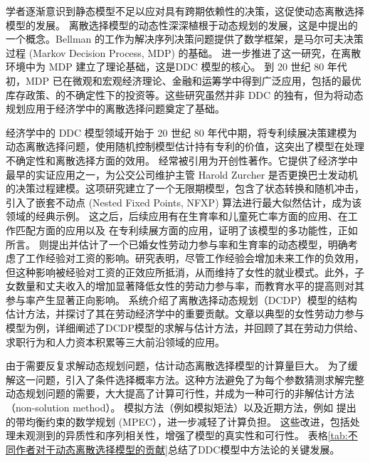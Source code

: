 \documentclass[a4paper,12pt,oneside, fontset=mac]{ctexbook} %
\begin{document}
学者逐渐意识到静态模型不足以应对具有跨期依赖性的决策，这促使动态离散选择模型的发展。 离散选择模型的动态性深深植根于动态规划的发展，这是\cite{bellmanDynamicProgramming1957}中提出的一个概念。Bellman 的工作为解决序列决策问题提供了数学框架，是马尔可夫决策过程 (Markov Decision Process, MDP) 的基础。 
\cite{blackwellDiscreteDynamicProgramming1962}进一步推进了这一研究，在离散环境中为 MDP 建立了理论基础，这是DDC 模型的核心。
到 20 世纪 80 年代初，MDP 已在微观和宏观经济理论、金融和运筹学中得到广泛应用，包括\cite{arrowOptimalInventoryPolicy1951}的最优库存政策、\cite{lucasInvestmentUncertainty1971}的不确定性下的投资等。这些研究虽然并非 DDC 的独有，但为将动态规划应用于经济学中的离散选择问题奠定了基础。

经济学中的 DDC 模型领域开始于 20 世纪 80 年代中期，\cite{pakesPatentsOptionsEstimates1986}将专利续展决策建模为动态离散选择问题，使用随机控制模型估计持有专利的价值，这突出了模型在处理不确定性和离散选择方面的效用。
\cite{rustOptimalReplacementGMC1987}经常被引用为开创性著作。它提供了经济学中最早的实证应用之一，为公交公司维护主管 Harold Zurcher 是否更换巴士发动机的决策过程建模。这项研究建立了一个无限期模型，包含了状态转换和随机冲击，引入了嵌套不动点 (Nested Fixed Points, NFXP) 算法进行最大似然估计，成为该领域的经典示例。
这之后，后续应用有\cite{wolpinEstimableDynamicStochastic1984}在生育率和儿童死亡率方面的应用、\cite{millerCultureDevelopmentEveryday1984}在工作匹配方面的应用以及\cite{pakesPatentsOptionsEstimates1986} 在专利续展方面的应用，证明了该模型的多功能性，正如\cite{aguirregabiriaDynamicDiscreteChoice2010}所言。
\cite{ecksteinDynamicLabourForce1989}则提出并估计了一个已婚女性劳动力参与率和生育率的动态模型，明确考虑了工作经验对工资的影响。研究表明，尽管工作经验会增加未来工作的负效用，但这种影响被经验对工资的正效应所抵消，从而维持了女性的就业模式。此外，子女数量和丈夫收入的增加显著降低女性的劳动力参与率，而教育水平的提高则对其参与率产生显著正向影响。
\cite{keaneStructuralEstimationBehavioral2011}系统介绍了离散选择动态规划（DCDP）模型的结构估计方法，并探讨了其在劳动经济学中的重要贡献。文章以典型的女性劳动力参与模型为例，详细阐述了DCDP模型的求解与估计方法，并回顾了其在劳动力供给、求职行为和人力资本积累等三大前沿领域的应用。


由于需要反复求解动态规划问题，估计动态离散选择模型的计算量巨大。
为了缓解这一问题，\cite{hotzConditionalChoiceProbabilities1993}引入了条件选择概率方法。这种方法避免了为每个参数猜测求解完整动态规划问题的需要，大大提高了计算可行性，并成为一种可行的非解估计方法（non-solution method）。
模拟方法（例如模拟矩法）以及近期方法，例如 \cite{suConstrainedOptimizationApproaches2012}提出的带均衡约束的数学规划 (MPEC），进一步减轻了计算负担。
这些改进，包括处理未观测到的异质性和序列相关性，增强了模型的真实性和可行性。
表格\ref{tab:不同作者对于动态离散选择模型的贡献}总结了DDC模型中方法论的关键发展。
\end{document}
